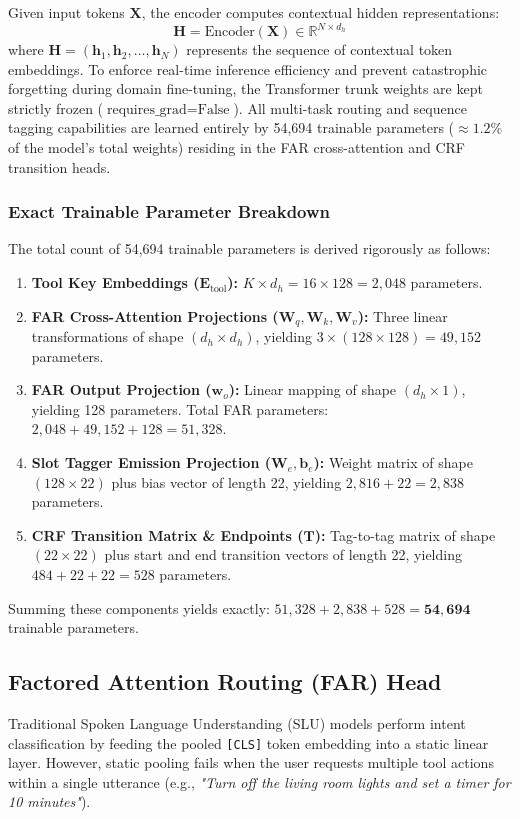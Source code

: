 \documentclass[conference]{IEEEtran}
\begin{document}
Given input tokens $\mathbf{X}$, the encoder computes contextual hidden representations:
\begin{equation}
    \mathbf{H} = \text{Encoder}(\mathbf{X}) \in \mathbb{R}^{N \times d_h}
\end{equation}
where $\mathbf{H}=(\mathbf{h}_1,\mathbf{h}_2, \dots , \mathbf{h}_N)$ represents the sequence of contextual token embeddings. To enforce real-time inference efficiency and prevent catastrophic forgetting during domain fine-tuning, the Transformer trunk weights are kept strictly frozen ($\text{requires\_grad}=\text{False}$). All multi-task routing and sequence tagging capabilities are learned entirely by 54,694 trainable parameters ($\approx 1.2\%$ of the model's total weights) residing in the FAR cross-attention and CRF transition heads.

\subsubsection{Exact Trainable Parameter Breakdown}
The total count of 54,694 trainable parameters is derived rigorously as follows:
\begin{enumerate}
    \item \textbf{Tool Key Embeddings ($\mathbf{E}_{\text{tool}}$):} $K \times d_h = 16 \times 128 = 2,048$ parameters.
    \item \textbf{FAR Cross-Attention Projections ($\mathbf{W}_q, \mathbf{W}_k, \mathbf{W}_v$):} Three linear transformations of shape $(d_h \times d_h)$, yielding $3 \times (128 \times 128) = 49,152$ parameters.
    \item \textbf{FAR Output Projection ($\mathbf{w}_o$):} Linear mapping of shape $(d_h \times 1)$, yielding 128 parameters. Total FAR parameters: $2,048 + 49,152 + 128 = 51,328$.
    \item \textbf{Slot Tagger Emission Projection ($\mathbf{W}_e, \mathbf{b}_e$):} Weight matrix of shape $(128 \times 22)$ plus bias vector of length 22, yielding $2,816 + 22 = 2,838$ parameters.
    \item \textbf{CRF Transition Matrix \& Endpoints ($\mathbf{T}$):} Tag-to-tag matrix of shape $(22 \times 22)$ plus start and end transition vectors of length 22, yielding $484 + 22 + 22 = 528$ parameters.
\end{enumerate}
Summing these components yields exactly: $51,328 + 2,838 + 528 = \mathbf{54,694}$ trainable parameters.

\subsection{Factored Attention Routing (FAR) Head}
Traditional Spoken Language Understanding (SLU) models perform intent classification by feeding the pooled \texttt{[CLS]} token embedding into a static linear layer. However, static pooling fails when the user requests multiple tool actions within a single utterance (e.g., \emph{"Turn off the living room lights and set a timer for 10 minutes"}).
\end{document}
